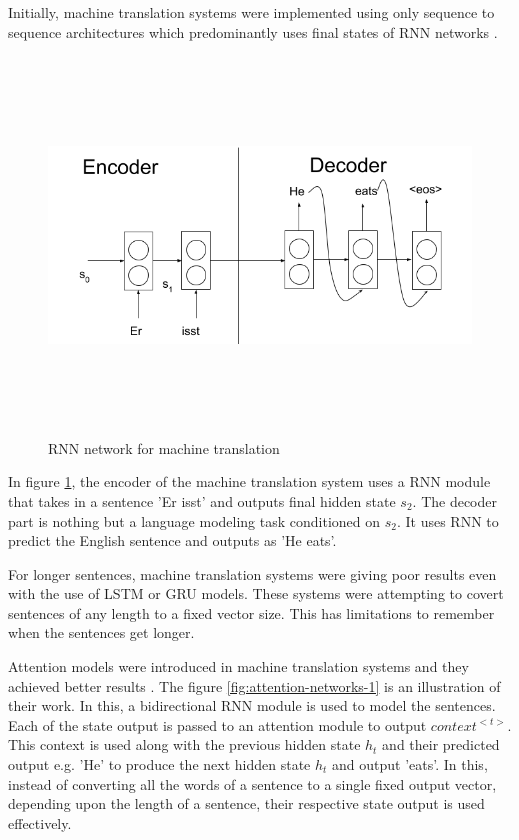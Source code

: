 \documentclass[a4paper, 11pt]{article}
\begin{document}
 Initially, machine translation systems were implemented using only sequence to sequence architectures which predominantly uses final states of RNN networks \parencite{sutskever2014sequence}. 

\begin{figure}[H]
    \centering
    \includegraphics[width=\textwidth,height=10cm,keepaspectratio=true]
    {machine-translation-1.png}
    \caption{
        RNN network for machine translation \parencite{GerElmo}
    }
    \label{fig:machine-translation-1}
\end{figure}

In figure \ref{fig:machine-translation-1}, the encoder of the machine translation system uses a RNN module that takes in a sentence 'Er isst' and outputs final hidden state $s_2$. The decoder part is nothing but a language modeling task conditioned on $s_2$. It uses RNN to predict the English sentence and outputs as 'He eats'. 

For longer sentences, machine translation systems were giving poor results even with the use of LSTM or GRU models. These systems were attempting to covert sentences of any length to a fixed vector size. This has limitations to remember when the sentences get longer. 

Attention models were introduced in machine translation systems and they achieved better results \parencite{bahdanau2014neural}. The figure \ref{fig:attention-networks-1} is an illustration of their work. In this, a bidirectional RNN module is used to model the sentences. Each of the state output is passed to an attention module to output $context^{<t>}$. This context is used along with the previous hidden state $h_t$ and their predicted output e.g. 'He' to produce the next hidden state $h_t$ and output 'eats'. In this, instead of converting all the words of a sentence to a single fixed output vector, depending upon the length of a sentence, their respective state output is used effectively. 
\end{document}
